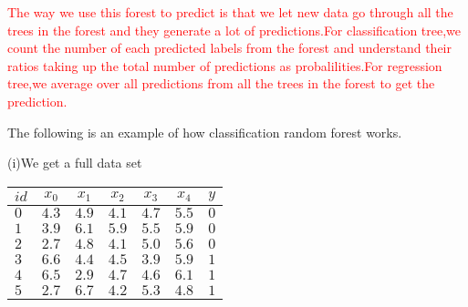 \documentclass{article}
\begin{document}
\textcolor{red}{The way we use this forest to predict is that we let new data go through all the trees in the forest and they generate a lot of predictions.For classification tree,we count the number of each predicted labels from the forest and understand their ratios taking up the total number of predictions as probalilities.For regression tree,we average over all predictions from all the trees in the forest to get the prediction.}

The following is an example of how classification random forest works.

(i)We get a full data set
\begin{center}
\begin{tabular}{|l|c|c|c|c|c|r|}
	\hline
	$id$&$x_0$&$x_1$&$x_2$&$x_3$&$x_4$&$y$\\ \hline
	$0$&$4.3$&$4.9$&$4.1$&$4.7$&$5.5$&$0$\\ \hline
	$1$&$3.9$&$6.1$&$5.9$&$5.5$&$5.9$&$0$\\ \hline
	$2$&$2.7$&$4.8$&$4.1$&$5.0$&$5.6$&$0$\\ \hline
	$3$&$6.6$&$4.4$&$4.5$&$3.9$&$5.9$&$1$\\ \hline
	$4$&$6.5$&$2.9$&$4.7$&$4.6$&$6.1$&$1$\\ \hline
	$5$&$2.7$&$6.7$&$4.2$&$5.3$&$4.8$&$1$\\ \hline
\end{tabular}
\end{center}
\end{document}
